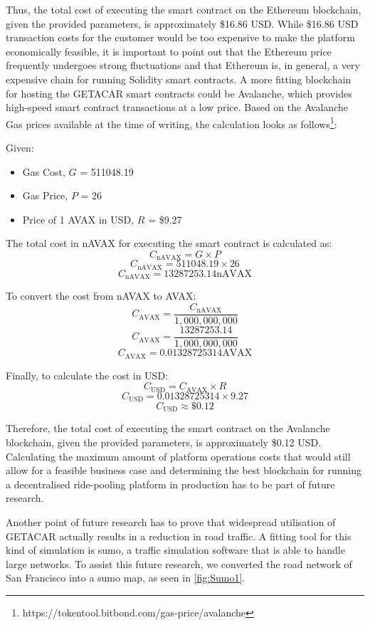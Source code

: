 Thus, the total cost of executing the smart contract on the Ethereum blockchain, given the provided parameters, is approximately \$16.86 USD. While \$16.86 USD transaction costs for the customer would be too expensive to make the platform economically feasible, it is important to point out that the Ethereum price frequently undergoes strong fluctuations and that Ethereum is, in general, a very expensive chain for running Solidity smart contracts. A more fitting blockchain for hosting the GETACAR smart contracts could be Avalanche, which provides high-speed smart contract transactions at a low price. Based on the Avalanche Gas prices available at the time of writing, the calculation looks as follows\footnote{https://tokentool.bitbond.com/gas-price/avalanche}:

Given:
\begin{itemize}
    \item Gas Cost, \( G \) = 511048.19
    \item Gas Price, \( P \) = 26 
    \item Price of 1 AVAX in USD, \( R \) = \$9.27
\end{itemize}

The total cost in nAVAX for executing the smart contract is calculated as:
\[ C_{\text{nAVAX}} = G \times P \]
\[ C_{\text{nAVAX}} = 511048.19 \times 26 \]
\[ C_{\text{nAVAX}} = 13287253.14 \text{nAVAX} \]

To convert the cost from nAVAX to AVAX:
\[ C_{\text{AVAX}} = \frac{C_{\text{nAVAX}}}{1,000,000,000} \]
\[ C_{\text{AVAX}} = \frac{13287253.14}{1,000,000,000} \]
\[ C_{\text{AVAX}} = 0.01328725314 \text{AVAX} \]

Finally, to calculate the cost in USD:
\[ C_{\text{USD}} = C_{\text{AVAX}} \times R \]
\[ C_{\text{USD}} = 0.01328725314 \times 9.27 \]
\[ C_{\text{USD}} \approx \$0.12 \]

Therefore, the total cost of executing the smart contract on the Avalanche blockchain, given the provided parameters, is approximately \$0.12 USD. Calculating the maximum amount of platform operations costs that would still allow for a feasible business case and determining the best blockchain for running a decentralised ride-pooling platform in production has to be part of future research. 

Another point of future research has to prove that widespread utilisation of GETACAR actually results in a reduction in road traffic. A fitting tool for this kind of simulation is \gls{sumo}, a  traffic simulation software that is able to handle large networks. To assist this future research, we converted the road network of San Francisco into a \gls{sumo} map, as seen in \ref{fig:Sumo1}. 

